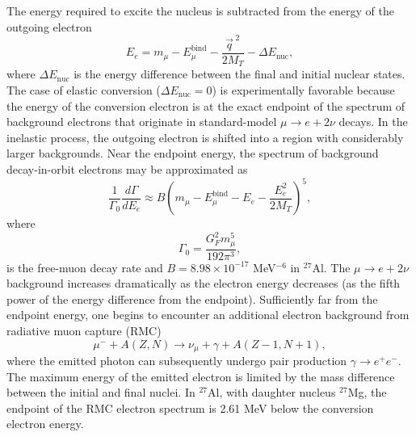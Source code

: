 \documentclass{book}[letterpaper,12pt]
\begin{document}
The energy required to excite the nucleus is subtracted from the energy of the outgoing electron
\begin{equation}
E_e=m_{\mu}-E^\mathrm{bind}_{\mu}-\frac{\vec{q}^{\;2}}{2M_T}-\Delta E_\mathrm{nuc}, 
\end{equation}
where $\Delta E_\mathrm{nuc}$ is the energy difference between the final and initial nuclear states. The case of elastic conversion ($\Delta E_\mathrm{nuc}=0$) is experimentally favorable because the energy of the conversion electron is at the exact endpoint of the spectrum of background electrons that originate in standard-model $\mu\rightarrow e+2\nu$ decays. In the inelastic process, the outgoing electron is shifted into a region with considerably larger backgrounds. Near the endpoint energy, the spectrum of background decay-in-orbit electrons may be approximated as \cite{Czarnecki:2011mx}
\begin{equation}
\frac{1}{\Gamma_0}\frac{d\Gamma}{dE_e}\approx B\left(m_{\mu}-E^\mathrm{bind}_{\mu}-E_e-\frac{E_e^2}{2M_T}\right)^5,
\end{equation}
where
\begin{equation}
\Gamma_0=\frac{G_F^2m_{\mu}^5}{192\pi^3},
\end{equation}
is the free-muon decay rate and $B=8.98\times 10^{-17}$ MeV$^{-6}$ in $^{27}$Al. The $\mu\rightarrow e+2\nu$ background increases dramatically as the electron energy decreases (as the fifth power of the energy difference from the endpoint). Sufficiently far from the endpoint energy, one begins to encounter an additional electron background from radiative muon capture (RMC)
\begin{equation}
\mu^-+A(Z,N)\rightarrow \nu_{\mu}+\gamma+A(Z-1,N+1),
\end{equation}
where the emitted photon can subsequently undergo pair production $\gamma\rightarrow e^+e^-$. The maximum energy of the emitted electron is limited by the mass difference between the initial and final nuclei. In $^{27}$Al, with daughter nucleus $^{27}$Mg, the endpoint of the RMC electron spectrum is 2.61 MeV below the conversion electron energy.
\end{document}
